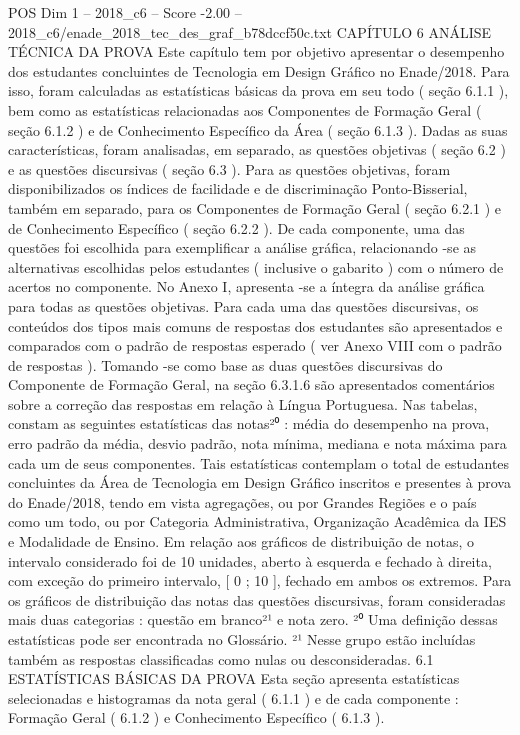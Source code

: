 \begin{textsample}{POS Dim 1 – 2018\_c6 – Score -2.00 – 2018\_c6/enade\_2018\_tec\_des\_graf\_b78dccf50c.txt}  \label{ex:f1_pos_244}
CAPÍTULO 6 ANÁLISE TÉCNICA DA PROVA Este capítulo tem por objetivo apresentar o desempenho dos estudantes concluintes de Tecnologia em Design Gráfico no Enade/2018.
Para isso, foram calculadas as estatísticas básicas da prova em seu todo ( seção 6.1.1 ), bem como as estatísticas relacionadas aos Componentes de Formação Geral ( seção 6.1.2 ) e de Conhecimento Específico da Área ( seção 6.1.3 ).
Dadas as suas características, foram analisadas, em separado, as questões objetivas ( seção 6.2 ) e as questões discursivas ( seção 6.3 ).
Para as questões objetivas, foram disponibilizados os índices de facilidade e de discriminação Ponto-Bisserial, também em separado, para os Componentes de Formação Geral ( seção 6.2.1 ) e de Conhecimento Específico ( seção 6.2.2 ).
De cada componente, uma das questões foi escolhida para exemplificar a análise gráfica, relacionando -se as alternativas escolhidas pelos estudantes ( inclusive o gabarito ) com o número de acertos no componente.
No Anexo I, apresenta -se a íntegra da análise gráfica para todas as questões objetivas.
Para cada uma das questões discursivas, os conteúdos dos tipos mais comuns de respostas dos estudantes são apresentados e comparados com o padrão de respostas esperado ( ver Anexo VIII com o padrão de respostas ).
Tomando -se como base as duas questões discursivas do Componente de Formação Geral, na seção 6.3.1.6 são apresentados comentários sobre a correção das respostas em relação à Língua Portuguesa.
Nas tabelas, constam as seguintes estatísticas das notas²⁰ : média do desempenho na prova, erro padrão da média, desvio padrão, nota mínima, mediana e nota máxima para cada um de seus componentes.
Tais estatísticas contemplam o total de estudantes concluintes da Área de Tecnologia em Design Gráfico inscritos e presentes à prova do Enade/2018, tendo em vista agregações, ou por Grandes Regiões e o país como um todo, ou por Categoria Administrativa, Organização Acadêmica da IES e Modalidade de Ensino.
Em relação aos gráficos de distribuição de notas, o intervalo considerado foi de 10 unidades, aberto à esquerda e fechado à direita, com exceção do primeiro intervalo, [ 0 ; 10 ], fechado em ambos os extremos.
Para os gráficos de distribuição das notas das questões discursivas, foram consideradas mais duas categorias : questão em branco²¹ e nota zero. ²⁰ Uma definição dessas estatísticas pode ser encontrada no Glossário. ²¹ Nesse grupo estão incluídas também as respostas classificadas como nulas ou desconsideradas. 6.1 ESTATÍSTICAS BÁSICAS DA PROVA Esta seção apresenta estatísticas selecionadas e histogramas da nota geral ( 6.1.1 ) e de cada componente : Formação Geral ( 6.1.2 ) e Conhecimento Específico ( 6.1.3 ).

\end{textsample}

